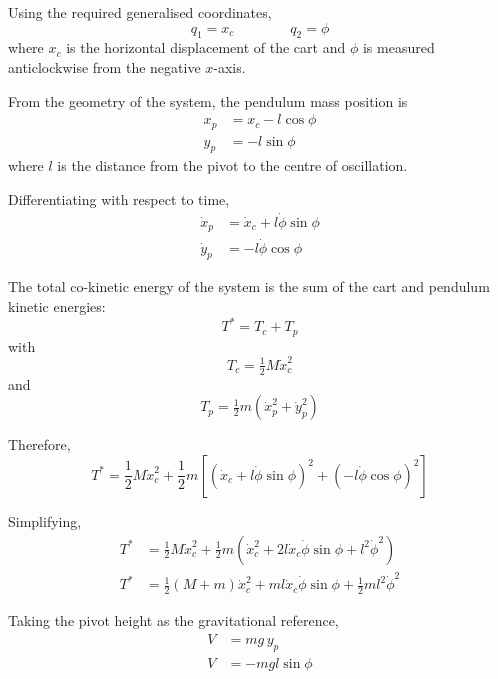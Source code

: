 \documentclass[11pt,a4paper]{article}
\begin{document}
Using the required generalised coordinates,
\begin{equation*}
	q_{1} = x_{c} \qquad\qquad q_{2} = \phi
\end{equation*}
where $x_{c}$ is the horizontal displacement of the cart and $\phi$ is measured
anticlockwise from the negative $x$-axis.

From the geometry of the system, the pendulum mass position is
\begin{align*}
	x_{p} &= x_{c} - l\cos\phi \\
	y_{p} &= -l\sin\phi
\end{align*}
where $l$ is the distance from the pivot to the centre of oscillation.

Differentiating with respect to time,
\begin{align*}
	\dot{x}_{p} &= \dot{x}_{c} + l\dot{\phi}\sin\phi \\
	\dot{y}_{p} &= -l\dot{\phi}\cos\phi
\end{align*}

The total co-kinetic energy of the system is the sum of the cart and pendulum
kinetic energies:
\begin{equation*}
	T^{*} = T_{c} + T_{p}
\end{equation*}
with
\begin{equation*}
	T_{c} = \tfrac{1}{2} M \dot{x}_{c}^{2}
\end{equation*}
and
\begin{equation*}
	T_{p} = \tfrac{1}{2} m \left( \dot{x}_{p}^{2} + \dot{y}_{p}^{2} \right)
\end{equation*}

Therefore,
\begin{equation*}
	T^{*} = \frac{1}{2} M \dot{x}_{c}^{2}
	+ \frac{1}{2} m \left[ \left( \dot{x}_{c} + l\dot{\phi}\sin\phi \right)^{2}
	+ \left( -l\dot{\phi}\cos\phi \right)^{2} \right]
\end{equation*}

Simplifying,
\begin{align*}
	T^{*} &= \frac{1}{2} M \dot{x}_{c}^{2}
	+ \frac{1}{2} m \left( \dot{x}_{c}^{2}
	+ 2 l \dot{x}_{c} \dot{\phi} \sin\phi + l^{2}\dot{\phi}^{2} \right) \\
	T^{*} &= \frac{1}{2} \left( M + m \right) \dot{x}_{c}^{2}
	+ m l \dot{x}_{c} \dot{\phi} \sin\phi
	+ \frac{1}{2} m l^{2} \dot{\phi}^{2}
\end{align*}

Taking the pivot height as the gravitational reference,
\begin{align*}
	V &= m g\, y_{p} \\
	V &= -m g l \sin\phi
\end{align*}
\end{document}
